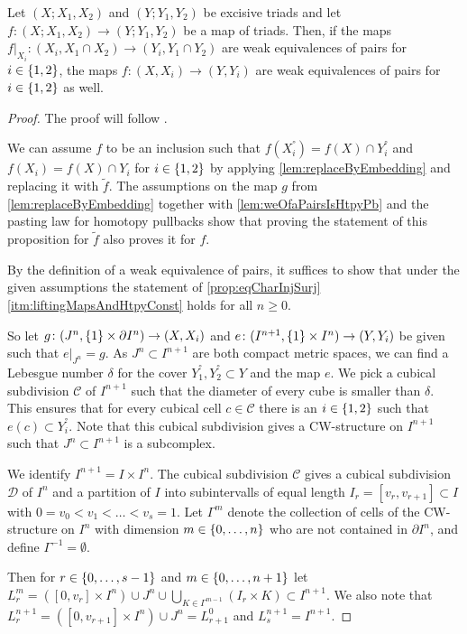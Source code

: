 \begin{prop}\label{prop:descentForPairs}
    Let $(X;X_1,X_2)$ and $(Y;Y_1,Y_2)$ be excisive triads and let $f\colon (X;X_1,X_2)\to (Y;Y_1,Y_2)$ be a map of triads.
    Then, if the maps $f|_{X_i}\colon(X_i,X_1\cap X_2)\to(Y_i,Y_1\cap Y_2)$ are weak equivalences of pairs for $i\in\left\lbrace1,2\right\rbrace$, the maps $f\colon(X,X_i)\to(Y,Y_i)$ are weak equivalences of pairs for $i\in\left\lbrace1,2\right\rbrace$ as well.
    \begin{proof}
        The proof will follow \cite[Theorem 1.2]{may1990weak}.

        We can assume $f$ to be an inclusion such that $f(X_i^°)=f(X)\cap Y_i^°$ and $f(X_i)=f(X)\cap Y_i$ for $i\in\left\lbrace1,2\right\rbrace$ by applying \cref{lem:replaceByEmbedding} and replacing it with $\widetilde{f}$.
        The assumptions on the map $g$ from \cref{lem:replaceByEmbedding} together with \cref{lem:weOfaPairsIsHtpyPb} and the pasting law for homotopy pullbacks show that proving the statement of this proposition for $\widetilde{f}$ also proves it for $f$.
        
        By the definition of a weak equivalence of pairs, it suffices to show that under the given assumptions the statement of \cref{prop:eqCharInjSurj} \ref{itm:liftingMapsAndHtpyConst} holds for all $n\geq 0$.
    
        So let $g\colon(J^n,\left\lbrace1\right\rbrace\times\partial I^n)\to(X,X_i)$ and $e\colon(I^{n+1},\left\lbrace1\right\rbrace\times I^n)\to(Y,Y_i)$ be given such that $e|_{J^n}=g$.
        As $J^n\subset I^{n+1}$ are both compact metric spaces, we can find a Lebesgue number $\delta$ for the cover $Y_1^°,Y_2^°\subset Y$ and the map $e$.
        We pick a cubical subdivision $\mathcal{C}$ of $I^{n+1}$ such that the diameter of every cube is smaller than $\delta$.
        This ensures that for every cubical cell $c\in\mathcal{C}$ there is an $i\in\left\lbrace1,2\right\rbrace$ such that $e(c)\subset Y_i^°$.
        Note that this cubical subdivision gives a CW-structure on $I^{n+1}$ such that $J^n\subset I^{n+1}$ is a subcomplex.

        We identify $I^{n+1}=I\times I^n$.
        The cubical subdivision $\mathcal{C}$ gives a cubical subdivision $\mathcal{D}$ of $I^n$ and a partition of $I$ into subintervalls of equal length $I_r=[v_r,v_{r+1}]\subset I$ with $0=v_0<v_1<\ldots<v_s=1$.
        Let $\Gamma^m$ denote the collection of cells of the CW-structure on $I^n$ with dimension $m\in\left\lbrace0,\ldots,n\right\rbrace$ who are not contained in $\partial I^n$, and define $\Gamma^{-1}=\emptyset$.
        
        Then for $r\in\left\lbrace0,\ldots,s-1\right\rbrace$ and $m\in\left\lbrace0,\ldots,n+1\right\rbrace$ let $L_r^m=\left([0,v_r]\times I^n\right)\cup J^n\cup\bigcup\limits_{K\in\Gamma^{m-1}}\left(I_r\times K\right)\subset I^{n+1}$.
        We also note that $L_r^{n+1}=\left([0,v_{r+1}]\times I^n\right)\cup J^n=L_{r+1}^0$ and $L_s^{n+1}=I^{n+1}$.


\end{proof}
\end{prop}
